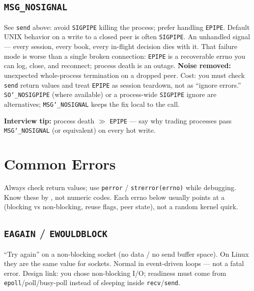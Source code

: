 \subsection{\texttt{MSG\_NOSIGNAL}}
\label{subsec:msg-nosignal}
See \texttt{send} above: avoid \texttt{SIGPIPE} killing the process; prefer handling \texttt{EPIPE}.
\newline
Default UNIX behavior on a write to a closed peer is often \texttt{SIGPIPE}. An unhandled 
signal  --- every session, every book, every in-flight 
decision dies with it. That failure mode is worse than a single broken connection: 
\texttt{EPIPE} is a recoverable errno you can log, close, and reconnect; process death is 
an outage.
\newline
\textbf{Noise removed:} unexpected whole-process termination on a dropped peer. Cost: you 
must check \texttt{send} return values and treat \texttt{EPIPE} as session teardown, not as 
``ignore errors.'' \texttt{SO\char`_NOSIGPIPE} (where available) or a process-wide 
\texttt{SIGPIPE} ignore are alternatives; \texttt{MSG\char`_NOSIGNAL} keeps the fix local to the call.
\par\noindent\textbf{Interview tip:} process death $\gg$ \texttt{EPIPE} --- say why trading processes 
pass \texttt{MSG\char`_NOSIGNAL} (or equivalent) on every hot write.

\section{Common Errors}
\label{sec:network-common-errors}
Always check return values; use \texttt{perror} / \texttt{strerror(errno)} while debugging. 
Know these by , not numeric codes. Each errno below usually 
points at a  (blocking vs non-blocking, reuse flags, peer state), 
not a random kernel quirk.

\subsection{\texttt{EAGAIN} / \texttt{EWOULDBLOCK}}
\label{subsec:eagain}
\label{subsec:ewouldblock}
``Try again'' on a non-blocking socket (no data / no send buffer space). On Linux they are 
the same value for sockets. Normal in event-driven loops --- not a fatal error.
\newline
Design link: you chose non-blocking I/O; readiness must come from \texttt{epoll}/poll/busy-poll 
instead of sleeping inside \texttt{recv}/\texttt{send}.

